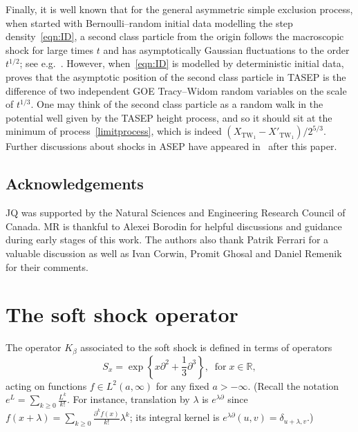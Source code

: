 \documentclass[10pt]{amsart}
\theoremstyle{definition}\newtheorem{defi}[theo]{Definition}\newtheorem{rema}[theo]{Remark}\newtheorem{exam}[theo]{Example}\newtheorem{exem}[theo]{Example}\newtheorem{nota}[theo]{Notation}
\DeclareMathOperator{\tw}{TW}
\newcommand{\R}{\mathbb{R}}
\begin{document}
Finally, it is well known that for the general asymmetric simple exclusion process, when started with Bernoulli--random initial data modelling the step density~\eqref{eqn:ID}, a second class particle from the origin follows the macroscopic shock for large times $t$ and has asymptotically Gaussian fluctuations to the order $t^{1/2}$; see e.g.~\cite{Lig}. However, when~\eqref{eqn:ID} is modelled by deterministic initial data, \cite{FGN} proves that the asymptotic position of the second class particle in TASEP is the difference of two independent GOE Tracy--Widom random variables on the scale of $t^{1/3}$. One may think of the second class particle as a random walk in the potential well given by the TASEP height process, and so it should sit at the minimum of process~\eqref{limitprocess}, which is indeed $(X_{\tw_1}- X'_{\tw_1})/2^{5/3}$. Further discussions about shocks in ASEP have appeared in~\cite{BB, N2} after this paper.

\subsection*{Acknowledgements}
JQ was supported by the Natural Sciences and Engineering Research Council of Canada. MR is thankful to Alexei Borodin for helpful discussions and guidance during early stages of this work. The authors also thank Patrik Ferrari for a valuable discussion as well as Ivan Corwin, Promit Ghosal and Daniel Remenik for their comments.

\section{The soft shock operator} \label{sec:softkernel}

The operator $K_{\beta}$ associated to the soft shock is defined in terms of operators
\begin{equation}\label{eqn:S}
S_x = \exp \left\{x \partial^2 + \frac{1}{3}\partial^3\right\}, \;\;\text{for}\; x \in \R,
\end{equation}
acting on functions $f \in L^2(a,\infty)$ for any fixed $a >-\infty$. (Recall the notation $e^L = \sum_{k \geq 0} \frac{L^k}{k!}$. For instance, translation by $\lambda$ is $e^{\lambda \partial}$ since $f(x + \lambda) = \sum_{k \geq 0} \frac{\partial^k f(x)}{k!} \lambda^k$; its integral kernel is $e^{\lambda \partial}(u,v) = \delta_{u+\lambda,v}$.)
\end{document}
